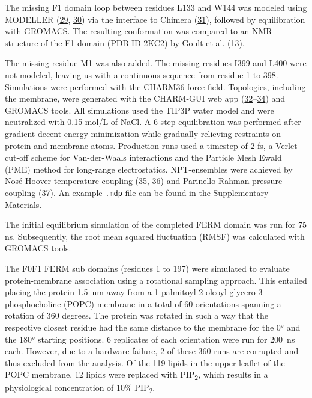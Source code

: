 \documentclass[
  twocolumn]{biophys-new-mod}
\begin{document}
The missing F1 domain loop between residues L133 and W144 was modeled
using MODELLER
(\protect\hyperlink{ref-marti-renomComparativeProteinStructure2000}{29},
\protect\hyperlink{ref-webbComparativeProteinStructure2016}{30}) via the
interface to Chimera
(\protect\hyperlink{ref-pettersenUCSFChimeraVisualization2004}{31}),
followed by equilibration with GROMACS. The resulting conformation was
compared to an NMR structure of the F1 domain (PDB-ID 2KC2) by Goult et
al. (\protect\hyperlink{ref-goultStructureDoubleUbiquitinlike2010}{13}).

The missing residue M1 was also added. The missing residues I399 and
L400 were not modeled, leaving us with a continuous sequence from
residue 1 to 398. Simulations were performed with the CHARM36 force
field. Topologies, including the membrane, were generated with the
CHARM-GUI web app
(\protect\hyperlink{ref-brooksCHARMMBiomolecularSimulation2009}{32}--\protect\hyperlink{ref-leeCHARMMGUIInputGenerator2016}{34})
and GROMACS tools. All simulations used the TIP3P water model and were
neutralized with 0.15 mol/L of NaCl. A 6-step equilibration was
performed after gradient decent energy minimization while gradually
relieving restraints on protein and membrane atoms. Production runs used
a timestep of 2 fs, a Verlet cut-off scheme for Van-der-Waals
interactions and the Particle Mesh Ewald (PME) method for long-range
electrostatics. NPT-ensembles were achieved by Nosé-Hoover temperature
coupling
(\protect\hyperlink{ref-hooverCanonicalDynamicsEquilibrium1985}{35},
\protect\hyperlink{ref-noseUnifiedFormulationConstant1984}{36}) and
Parinello-Rahman pressure coupling
(\protect\hyperlink{ref-parrinelloPolymorphicTransitionsSingle1981}{37}).
An example \texttt{.mdp}-file can be found in the Supplementary
Materials.

The initial equilibrium simulation of the completed FERM domain was run
for 75 ns. Subsequently, the root mean squared fluctuation (RMSF) was
calculated with GROMACS tools.

The F0F1 FERM sub domains (residues 1 to 197) were simulated to evaluate
protein-membrane association using a rotational sampling approach. This
entailed placing the protein 1.5~nm away from a
1-palmitoyl-2-oleoyl-glycero-3-phosphocholine (POPC) membrane in a total
of 60 orientations spanning a rotation of 360 degrees. The protein was
rotated in such a way that the respective closest residue had the same
distance to the membrane for the 0° and the 180° starting positions. 6
replicates of each orientation were run for 200~ns each. However, due to
a hardware failure, 2 of these 360 runs are corrupted and thus excluded
from the analysis. Of the 119 lipids in the upper leaflet of the POPC
membrane, 12 lipids were replaced with PIP\textsubscript{2}, which
results in a physiological concentration of 10\% PIP\textsubscript{2}.
\end{document}
